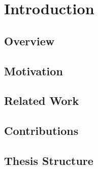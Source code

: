 \chapter{Introduction}
\section{Overview}

\section{Motivation}

\section{Related Work}

\section{Contributions}

\section{Thesis Structure}